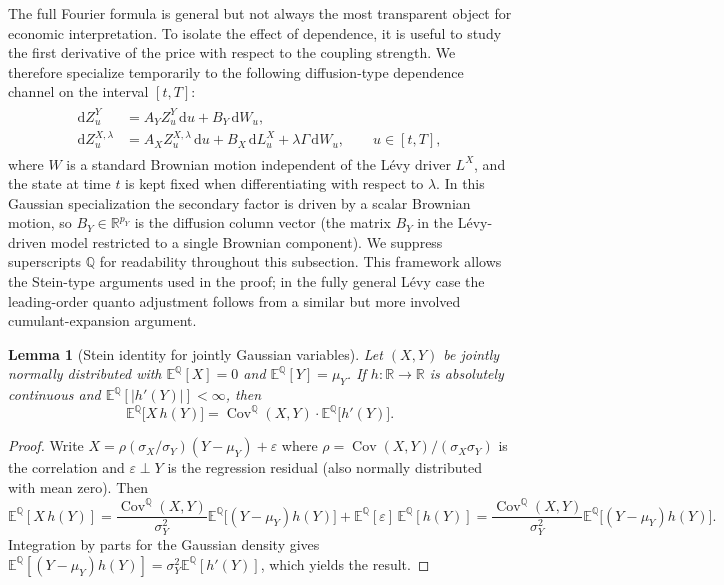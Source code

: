 \documentclass[10pt,a4paper,reqno]{amsart}
\newtheorem{lemma}[theorem]{Lemma}
\newcommand{\R}{\mathbb{R}}
\newcommand{\E}{\mathbb{E}}
\newcommand{\Q}{\mathbb{Q}}
\newcommand{\1}{\mathbbm{1}}
\newcommand{\dd}{\mathrm{d}}
\DeclareMathOperator{\Cov}{Cov}
\begin{document}
The full Fourier formula is general but not always the most transparent object
for economic interpretation. To isolate the effect of dependence, it is useful
to study the first derivative of the price with respect to the coupling
strength. We therefore specialize temporarily to the following diffusion-type
dependence channel on the interval $[t,T]$:
\begin{align}\label{eq:weak_coupling_model}
\begin{aligned}
  \dd Z_u^{Y}
    &= A_Y Z_u^{Y}\,\dd u + B_Y\,\dd W_u,\\
  \dd Z_u^{X,\lambda}
    &= A_X Z_u^{X,\lambda}\,\dd u
       + B_X\,\dd L_u^X
       + \lambda \Gamma\,\dd W_u,
  \qquad u \in [t,T],
\end{aligned}
\end{align}
where $W$ is a standard Brownian motion independent of the Lévy driver
$L^X$, and the state at time $t$ is kept fixed when differentiating with
respect to $\lambda$. In this Gaussian specialization the secondary factor is
driven by a scalar Brownian motion, so $B_Y \in \R^{p_Y}$ is the diffusion
column vector (the matrix $B_Y$ in the
Lévy-driven model restricted to a single Brownian component). We suppress
superscripts $\Q$ for readability throughout this subsection. This framework
allows the Stein-type arguments used in the proof; in the fully general Lévy
case the leading-order quanto adjustment follows from a
similar but more involved cumulant-expansion argument.

\begin{lemma}[Stein identity for jointly Gaussian variables]
\label{lem:stein}
Let $(X,Y)$ be jointly normally distributed with $\E^\Q[X] = 0$ and
$\E^\Q[Y] = \mu_Y$. If $h:\R\to\R$ is absolutely continuous and
$\E^\Q[|h'(Y)|] < \infty$, then
$$
  \E^\Q\bigl[X\,h(Y)\bigr]
  = \Cov^\Q(X,Y)\cdot\E^\Q\bigl[h'(Y)\bigr].
$$
\end{lemma}

\begin{proof}
Write $X = \rho(\sigma_X/\sigma_Y)(Y-\mu_Y) + \varepsilon$ where
$\rho = \Cov(X,Y)/(\sigma_X\sigma_Y)$ is the correlation and
$\varepsilon \perp Y$ is the regression residual (also normally distributed with
mean zero). Then
$$
  \E^\Q[X\,h(Y)]
  = \frac{\Cov^\Q(X,Y)}{\sigma_Y^2}
    \E^\Q\bigl[(Y-\mu_Y)h(Y)\bigr]
  + \E^\Q[\varepsilon]\,\E^\Q[h(Y)]
  = \frac{\Cov^\Q(X,Y)}{\sigma_Y^2}
    \E^\Q\bigl[(Y-\mu_Y)h(Y)\bigr].
$$
Integration by parts for the Gaussian density gives
$\E^\Q[(Y-\mu_Y)h(Y)] = \sigma_Y^2 \E^\Q[h'(Y)]$,
which yields the result.
\end{proof}
\end{document}
